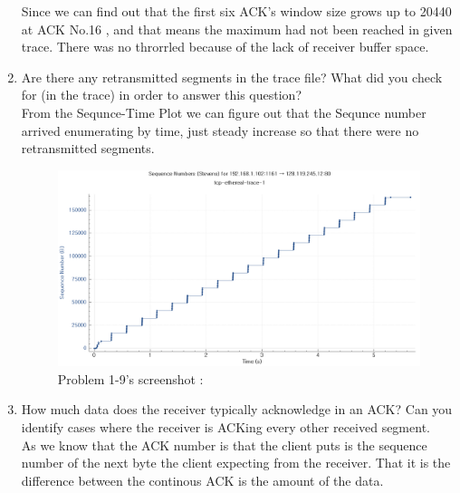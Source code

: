 \begin{enumerate}[label=\bfseries Problem \arabic*:,leftmargin=*,labelindent=1em]
        Since we can find out that the first six ACK’s window size grows up to 20440 at ACK No.16 , and that means the maximum had not been reached in given trace. There was no throrrled because of the lack of receiver buffer space.
        \item Are there any retransmitted segments in the trace file? What did you check for (in the trace) in order to answer this question?\\[0.2mm]
        \soln From the Sequnce-Time Plot we can figure out that the Sequnce number arrived enumerating by time, just steady increase so that there were no retransmitted segments.
        \begin{figure}[!h]\centering
        \hspace{15mm}  
    		\includegraphics[width=.75\textwidth]{image/week02/1-9-1.png}
    		\caption{\footnotesize Problem 1-9's screenshot : }
    		\vspace{-10pt}
        \end{figure}
\clearpage
        \item How much data does the receiver typically acknowledge in an ACK? Can you identify cases where the receiver is ACKing every other received segment.\\[0.2mm]
        \soln As we know that the ACK number is that the client puts is  the sequence number of the next byte the client expecting from the receiver. That it is the difference between the continous ACK is the amount of the data.

\end{enumerate}
